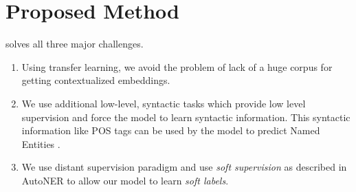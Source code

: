 \section{Proposed Method}
\label{sec:proposed_method}
\method{} solves all three major challenges.
\begin{enumerate}
	\item Using transfer learning, we avoid the problem of lack of a huge corpus for getting contextualized embeddings.
	\item We use additional low-level, syntactic tasks which provide low level supervision and force the model to learn syntactic information. This syntactic information like POS tags can be used by the model to predict Named Entities \cite{autoner} .
	\item We use distant supervision paradigm and use \textit{soft supervision} as described in AutoNER to allow our model to learn \textit{soft labels}.
\end{enumerate}